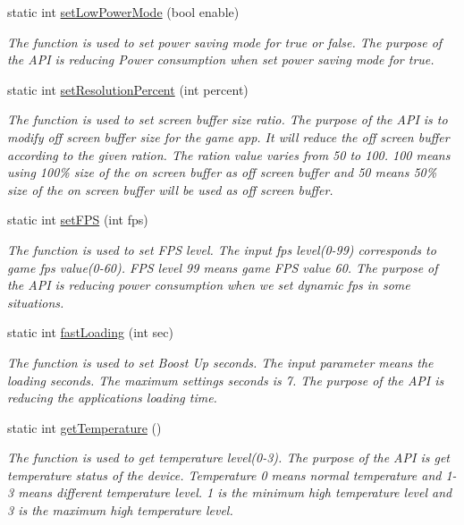 \begin{DoxyCompactItemize}
static int \hyperlink{classEnhanceAPI_ad42c34b31bc6dc5f6e8b343817b50952}{set\+Low\+Power\+Mode} (bool enable)
\begin{DoxyCompactList}\small\item\em The function is used to set power saving mode for true or false. The purpose of the A\+PI is reducing Power consumption when set power saving mode for true. \end{DoxyCompactList}\item 
static int \hyperlink{classEnhanceAPI_a06955ddbf64fd06570427e35654a314c}{set\+Resolution\+Percent} (int percent)
\begin{DoxyCompactList}\small\item\em The function is used to set screen buffer size ratio. The purpose of the A\+PI is to modify off screen buffer size for the game app. It will reduce the off screen buffer according to the given ration. The ration value varies from 50 to 100. 100 means using 100\% size of the on screen buffer as off screen buffer and 50 means 50\% size of the on screen buffer will be used as off screen buffer. \end{DoxyCompactList}\item 
static int \hyperlink{classEnhanceAPI_a7a0cdc9dde13a4f8545245fe0dd5ddbc}{set\+F\+PS} (int fps)
\begin{DoxyCompactList}\small\item\em The function is used to set F\+PS level.  The input fps level(0-\/99) corresponds to game fps value(0-\/60). F\+PS level 99 means game F\+PS value 60. The purpose of the A\+PI is reducing power consumption when we set dynamic fps in some situations. \end{DoxyCompactList}\item 
static int \hyperlink{classEnhanceAPI_a971131b6cc44e55336d31deb3a7f8063}{fast\+Loading} (int sec)
\begin{DoxyCompactList}\small\item\em The function is used to set Boost Up seconds. The input parameter means the loading seconds. The maximum settings seconds is 7. The purpose of the A\+PI is reducing the application\textquotesingle{}s loading time. \end{DoxyCompactList}\item 
static int \hyperlink{classEnhanceAPI_a35587d100e1f41c200a75c5368575cc0}{get\+Temperature} ()
\begin{DoxyCompactList}\small\item\em The function is used to get temperature level(0-\/3). The purpose of the A\+PI is get temperature status of the device. Temperature 0 means normal temperature and 1-\/3 means different temperature level. 1 is the minimum high temperature level and 3 is the maximum high temperature level. \end{DoxyCompactList}\item 

\end{DoxyCompactItemize}
